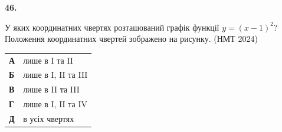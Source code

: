 \documentclass[14pt]{extarticle}
\newcommand{\nmtyear}[1]{\hfill{\small\color{yearcolor}(НМТ #1)}}
\begin{document}
\vspace{0.7cm}

\noindent\textbf{46.} \begin{minipage}[t]{0.55\textwidth}
У яких координатних чвертях розташований графік функції $y = (x - 1)^2$? Положення координатних чвертей зображено на рисунку. \nmtyear{2024}
\end{minipage}
\hfill
\begin{minipage}[t]{0.4\textwidth}
    \vspace{-0.5cm}
    \begin{flushright}
    \end{flushright}
\end{minipage}

\vspace{0.3cm}
\begin{tabular}{ll}
    \textbf{А} & лише в I та II \\
    \textbf{Б} & лише в I, II та III \\
    \textbf{В} & лише в II та III \\
    \textbf{Г} & лише в I, II та IV \\
    \textbf{Д} & в усіх чвертях \\
\end{tabular}

\vspace{0.7cm}
\end{document}
